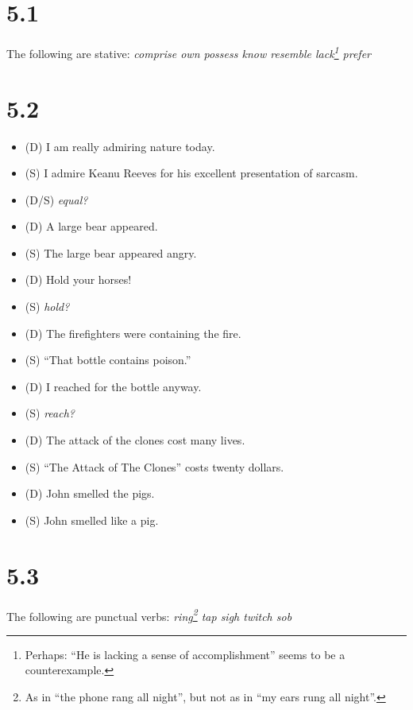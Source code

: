 \documentclass[12pt]{article}
\begin{document}
\section*{5.1}
The following are stative: \textit{comprise own possess know resemble
lack\footnote{Perhaps: ``He is lacking a sense of accomplishment'' seems
to be a counterexample.} prefer}

\section*{5.2}
\begin{itemize}
\item (D) I am really admiring nature today.
\item (S) I admire Keanu Reeves for his excellent presentation of sarcasm.
\item (D/S) \textit{equal?}
\item (D) A large bear appeared.
\item (S) The large bear appeared angry.
\item (D) Hold your horses!
\item (S) \textit{hold?}
\item (D) The firefighters were containing the fire.
\item (S) ``That bottle contains poison.''
\item (D) I reached for the bottle anyway.
\item (S) \textit{reach?}
\item (D) The attack of the clones cost many lives.
\item (S) ``The Attack of The Clones'' costs twenty dollars.
\item (D) John smelled the pigs.
\item (S) John smelled like a pig.
\end{itemize}

\section*{5.3}
The following are punctual verbs: \textit{ring\footnote{As in ``the
phone rang all night'', but not as in ``my ears rung all night''.} tap
sigh twitch sob}
\end{document}
